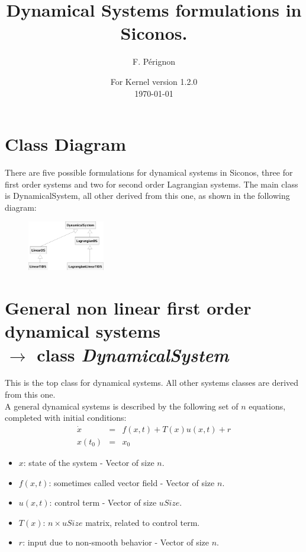 \documentclass[10pt]{article}
\begin{document}
\thispagestyle{empty}
\title{Dynamical Systems formulations in Siconos.}
\author{F. P\'erignon}

\date{For Kernel version 1.2.0 \\
 \today}
\maketitle

\pagestyle{fancy}

\section{Class Diagram}
There are five possible formulations for dynamical systems in Siconos,
three for first order systems and two for second order Lagrangian systems. The main class is DynamicalSystem, all other derived from this one, as shown in the following diagram:
\begin{figure}[htbp]
  \centering
 \includegraphics[width=0.3\textwidth]{./DSClassDiagram.eps}
  \label{DSDiagram}
\end{figure}
\section{General non linear first order dynamical systems \\ $\rightarrow$ class \it{DynamicalSystem}}
This is the top class for dynamical systems. All other systems classes are derived from this one. \\

A general dynamical systems is described by the following set of $n$ equations, completed with initial conditions:
\begin{eqnarray} \label{firstOrderSystem}
  \dot x &=& f(x,t) + T(x) u(x, t) + r \\
  x(t_0)&=&x_0 
\end{eqnarray}

\begin{itemize}
\item $x$: state of the system - Vector of size $n$.
\item $f(x,t)$: sometimes called vector field - Vector of size $n$.
\item $u(x, t)$: control term - Vector of size $uSize$.
\item $T(x)$: $n\times uSize$ matrix, related to control term.
\item $r$: input due to non-smooth behavior - Vector of size $n$.
\end{itemize}
\end{document}
